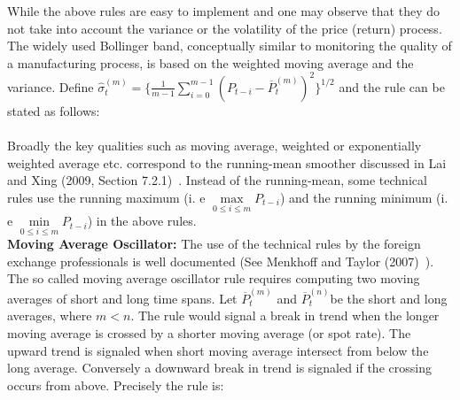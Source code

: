 While the above rules are easy to implement and one may observe that they do not take into account the variance or the volatility of the price (return) process. The widely used Bollinger band, conceptually similar to monitoring the quality of a manufacturing process, is based on the weighted moving average and the variance. Define $\hat{\sigma}_{t}^{(m)} = \{\frac{1}{m-1}\sum_{i=0}^{m-1}(P_{t-i} - \overline{P}_{t}^{(m)})^2\}^{1/2}$ and the rule can be stated as follows: \\[0.1cm]
\noindent{} \\


Broadly the key qualities such as moving average, weighted or exponentially weighted average etc. correspond to the running-mean smoother discussed in Lai and Xing (2009, Section 7.2.1)~\cite{lai1}. Instead of the running-mean, some technical rules use the running maximum (i. e $\max\limits_{0 \leq i \leq m} P_{t-i}$) and the running minimum (i. e $\min\limits_{0 \leq i \leq m} P_{t-i}$) in the above rules. \\


\noindent \textbf{Moving Average Oscillator:} The use of the technical rules by the foreign exchange professionals is well documented (See Menkhoff and Taylor (2007)~\cite{MalTay}). The so called moving average oscillator rule requires computing two moving averages of short and long time spans. Let $\overline{P}_{t}^{(m)}$ and $\overline{P}_{t}^{(n)}$be the short and long averages, where $m< n$. The rule would signal a break in trend when the longer moving average is crossed by a shorter moving average (or spot rate). The upward trend is signaled when short moving average intersect from below the long average. Conversely a downward break in trend is signaled if the crossing occurs from above. Precisely the rule is: \\[0.1cm]

\noindent{} \\


